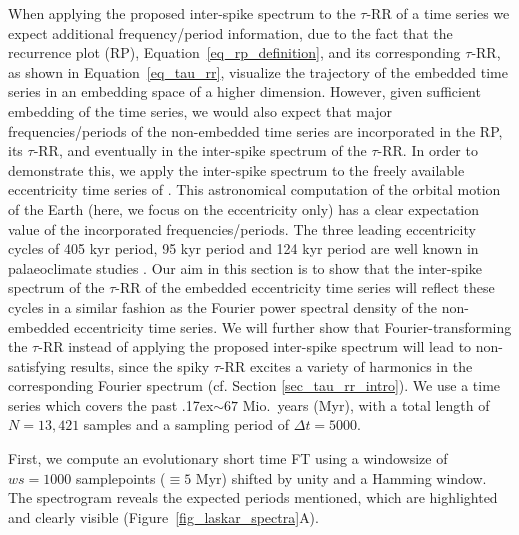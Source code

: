 \documentclass[entropy,article,accept,pdftex,moreauthors]{Definitions/mdpi}
\newcommand{\mytilde}{\raise.17ex\hbox{$\scriptstyle\mathtt{\sim}$}}
\begin{document}
When applying the proposed inter-spike spectrum to the $\tau$-RR of a time series we expect additional frequency/period information, due to the fact that the recurrence plot (RP), 
Equation~\eqref{eq_rp_definition}, and its corresponding $\tau$-RR, as shown in Equation~\eqref{eq_tau_rr}, visualize the trajectory of the embedded time series in an embedding space of a higher dimension. 
However, given sufficient embedding of the time series, we would also expect that major frequencies/periods of the non-embedded time series are incorporated in the RP, its $\tau$-RR, 
and eventually in the inter-spike spectrum of the $\tau$-RR. In order to demonstrate this, we apply the inter-spike spectrum to the freely available eccentricity time series of \mbox{\citet{Laskar2011}}. 
This astronomical computation of the orbital motion of the Earth (here, we focus on the eccentricity only) has a clear expectation value of the incorporated frequencies/periods. The three leading 
eccentricity cycles of 405 kyr period, 95 kyr period and 124 kyr period are well known in palaeoclimate studies \cite{Laskar2004,Westerhold2020}. Our aim in this section is to show that the inter-spike spectrum 
of the $\tau$-RR of the embedded eccentricity time series will reflect these cycles in a similar fashion as the Fourier power spectral density of the non-embedded eccentricity time series. We will further 
show that Fourier-transforming the $\tau$-RR instead of applying the proposed inter-spike spectrum will lead to non-satisfying results, since the spiky $\tau$-RR excites a variety of harmonics in 
the corresponding Fourier spectrum (cf. Section \ref{sec_tau_rr_intro}). We use a time series which covers the past \mytilde $67$ Mio.~years (Myr), with a total length of $N=13,421$ samples and a 
sampling period of $\Delta t= 5000$.

First, we compute an evolutionary short time FT using a windowsize of $ws=1000$ samplepoints ($\equiv 5$ Myr) shifted by unity and a Hamming window. The spectrogram reveals the expected periods mentioned, which are highlighted and clearly visible (Figure~\ref{fig_laskar_spectra}A). 
\end{document}
